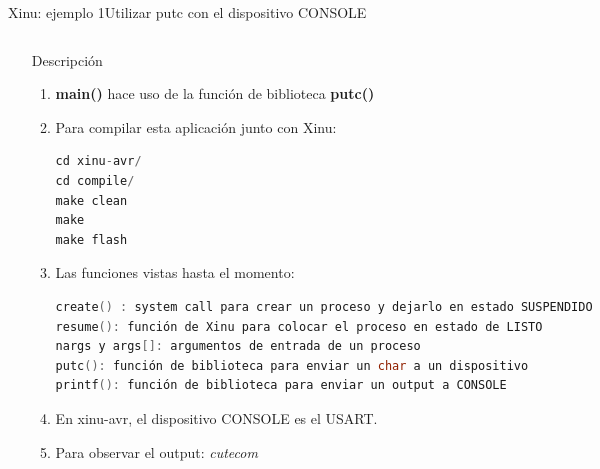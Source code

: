 \documentclass[8pt,aspectratio=169,compress]{beamer}
\begin{document}
\begin{frame}[fragile]{Xinu: ejemplo 1}{Utilizar putc con el dispositivo CONSOLE}

    \begin{columns}[onlytextwidth,T]
      \column{\dimexpr\linewidth-70mm-5mm}

\begin{small}
	\begin{itemize}
\bigskip
  \item[Descripción]
\begin{enumerate}
\item \textbf{main()} hace uso de la función de biblioteca \textbf{putc()}

\bigskip
\item Para compilar esta aplicación junto con Xinu: 

\begin{lstlisting}[language=c,basicstyle=\footnotesize]
cd xinu-avr/
cd compile/
make clean
make
make flash
\end{lstlisting}
\bigskip
\item Las funciones vistas hasta el momento:

\begin{lstlisting}[language=c,basicstyle=\footnotesize]
create() : system call para crear un proceso y dejarlo en estado SUSPENDIDO
resume(): función de Xinu para colocar el proceso en estado de LISTO
nargs y args[]: argumentos de entrada de un proceso
putc(): función de biblioteca para enviar un char a un dispositivo
printf(): función de biblioteca para enviar un output a CONSOLE
\end{lstlisting}

\bigskip
\item En xinu-avr, el dispositivo CONSOLE es el USART.

\bigskip
\item Para observar el output: \textit{cutecom}
\end{enumerate}
	\end{itemize}

\end{small}

      \column{60mm}
     \includegraphics[width=62mm]{images/ejemplo1.jpg}

    \end{columns}
\end{frame}
\end{document}

